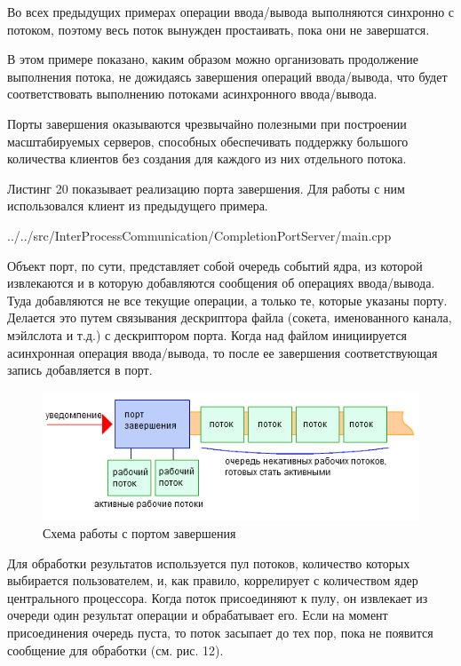 \documentclass[a4paper, 12pt]{report}		%
\begin{document}
Во всех предыдущих примерах операции ввода/вывода выполняются синхронно с потоком, поэтому весь поток вынужден простаивать, пока они не завершатся.
\vspace{1em}

В этом примере показано, каким образом можно организовать продолжение выполнения потока, не дожидаясь завершения операций ввода/вывода, что будет соответствовать выполнению потоками асинхронного ввода/вывода.
\vspace{1em}

Порты завершения оказываются чрезвычайно полезными при построении масштабируемых серверов, способных обеспечивать поддержку большого количества клиентов без создания для каждого из них отдельного потока. 
\vspace{1em}

Листинг 20 показывает реализацию порта завершения. Для работы с ним использовался клиент из предыдущего примера.


{../../src/InterProcessCommunication/CompletionPortServer/main.cpp}


Объект порт, по сути, представляет собой очередь событий ядра, из которой извлекаются и в которую добавляются сообщения об операциях ввода/вывода. Туда добавляются не все текущие операции, а только те, которые указаны порту. Делается это путем связывания дескриптора файла (сокета, именованного канала, мэйлслота и т.д.) с дескриптором порта. Когда над файлом инициируется асинхронная операция ввода/вывода, то после ее завершения соответствующая запись добавляется в порт.

\begin{figure}[h!]
\centering
\includegraphics[scale=1]{res/iop}
\caption{Схема работы с портом завершения}
\end{figure}

Для обработки результатов используется пул потоков, количество которых выбирается пользователем, и, как правило, коррелирует с количеством ядер центрального процессора. Когда поток присоединяют к пулу, он извлекает из очереди один результат операции и обрабатывает его. Если на момент присоединения очередь пуста, то поток засыпает до тех пор, пока не появится сообщение для обработки (см. рис. 12).
\end{document}

